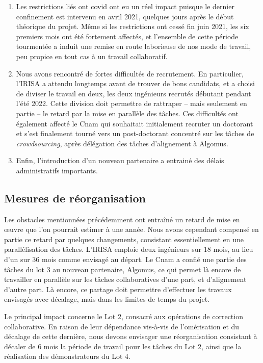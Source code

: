 \documentclass[11pt]{article}
\begin{document}
\begin{enumerate}
  \item Les restrictions liés ont covid ont eu un réel impact puisque le dernier confinement 
     est intervenu en avril 2021, quelques jours après le début théorique du projet. Même 
     si les restrictions ont cessé fin juin  2021, les six premiers mois ont été fortement
     affectés, et l'ensemble de cette période tourmentée a induit une remise en route laborieuse
     de nos mode de travail, peu propice en tout cas à un travail collaboratif.
    \item Nous avons rencontré de fortes difficultés de recrutement. En particulier, l'IRISA
     a attendu longtemps avant de trouver de bons candidats, et a choisi de diviser le travail
      en deux, les deux ingénieurs recrutés débutant pendant l'été 2022. Cette division doit permettre
      de rattraper -- mais seulement en partie -- le retard par la mise en parallèle des tâches. Ces difficultés
      ont également affecté le Cnam qui souhaitait initialement recruter un doctorant et s'est finalement
      tourné vers un post-doctorant concentré sur les tâches de \textit{crowdsourcing}, après
      délégation des tâches d'alignement à Algomus.
    \item Enfin, l'introduction d'un nouveau partenaire a entrainé des délais administratifs importants.    
\end{enumerate}


\subsection{Mesures de réorganisation}

Les obstacles mentionnées précédemment ont entraîné un
retard de mise en œuvre que l'on pourrait estimer à une année. Nous avons cependant compensé
en partie ce retard par quelques changements, consistant  essentiellement en une parallélisation
des tâches. L'IRISA emploie deux ingénieurs sur 18 mois, au lieu d'un sur 36 mois comme envisagé 
au départ. Le Cnam a confié une partie des tâches du lot 3 au nouveau partenaire, Algomus, 
ce qui permet là encore de travailler en parallèle sur les tâches collaboratives d'une part, et
d'alignement d'autre part.  Là encore, ce partage doit permettre d'effectuer les travaux envisagés
avec décalage, mais dans les limites de temps du projet.

Le principal impact concerne le Lot 2, consacré aux opérations de correction collaborative. En raison
de leur dépendance vis-à-vis de l'omérisation et du décalage de cette dernière, nous devons envisager 
une réorganisation consistant à décaler de 6 mois la période de travail pour les tâches du Lot 2,
ainsi que la réalisation des démonstrateurs du Lot 4.
\end{document}
